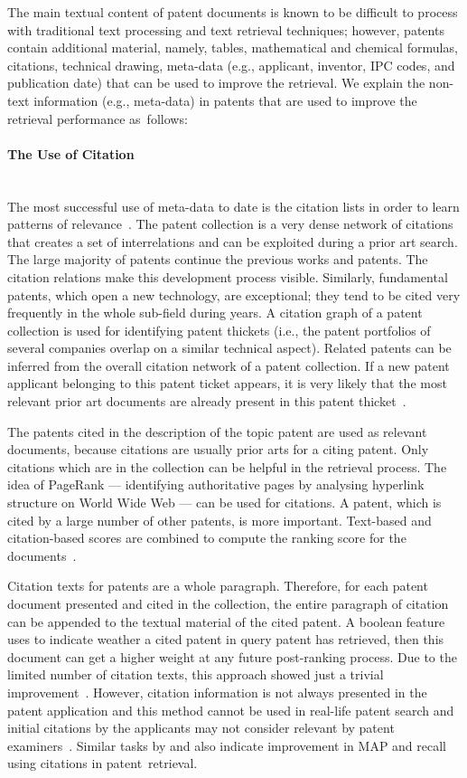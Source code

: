 The main textual content of patent documents is known to be difficult to process with traditional text processing and text retrieval techniques; however, patents contain additional material, namely, tables, mathematical and chemical formulas, citations, technical drawing, meta-data (e.g., applicant, inventor, IPC codes, and publication date) that can be used to improve the retrieval. We explain the non-text information (e.g., meta-data) in patents that are used to improve the retrieval performance as~follows:
\paragraph{The Use of Citation}
\ \\
The most successful use of meta-data to date is the citation lists in order to learn patterns of relevance~\citep{lupu2013patent}. The patent collection is a very dense network of citations that creates a set of interrelations and can be exploited during a prior art search. The large majority of patents continue the previous works and patents. The citation relations make this development process
visible. Similarly, fundamental patents, which open a new technology, are exceptional; they tend to be cited very frequently in the whole sub-field during years. A citation graph of a patent collection is used for identifying patent thickets (i.e., the patent portfolios of several companies overlap on a similar technical aspect). Related patents can be inferred from the overall citation network of a patent collection. If a new patent applicant belonging to this patent ticket appears, it is very likely that the most relevant prior art documents are already
present in this patent thicket~\citep{lopez2009multiple}.

The patents cited in the description of the topic patent are used as relevant documents, because citations are usually prior arts for a citing patent. Only citations which are in the collection can be helpful in the retrieval process. The idea of PageRank --- identifying authoritative pages by analysing hyperlink structure on World Wide Web --- can be used for citations. A patent, which is cited by a large number of other patents, is more important. Text-based and citation-based scores are combined to compute the ranking score for the documents~\citep{fujii2007enhancing, fujii2007integrating}.

Citation texts for patents are a whole paragraph. Therefore, for each patent document presented and cited in the collection, the entire paragraph of citation can be appended to the textual material of the cited patent. A boolean feature uses to indicate weather a cited patent in query patent has retrieved, then this document can get a higher weight at any future post-ranking process. Due to the limited number of citation texts, this approach showed just a trivial improvement~\citep{lopez2009multiple}. However, citation information is not always presented in the patent application and this method cannot be used in real-life patent search and initial citations by the applicants may not consider relevant by patent examiners~\citep{magdy2010applying, magdy2011simple}. 
Similar tasks by \cite{gobeill2010simple} and \cite{gurulingappa2010prior} also indicate improvement in MAP and recall using citations in patent~retrieval. 
